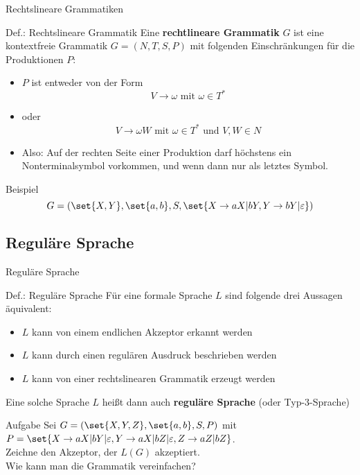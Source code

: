 \begin{frame}{Rechtslineare Grammatiken}
\begin{block}{Def.: Rechtslineare Grammatik}
	Eine \textbf{rechtlineare Grammatik} $G$ ist eine kontextfreie Grammatik $G = (N,T,S,P)$ mit folgenden Einschränkungen für die Produktionen $P$:\\
	\begin{itemize}
			\item $P$ ist entweder von der Form \[
		V \to \omega \text{ mit } \omega \in T^*
	\]
	\item oder \[
		V \to \omega W \text{ mit } \omega \in T^* \text{ und } V,W \in N
	\]
	\item Also: Auf der rechten Seite einer Produktion darf höchstens ein Nonterminalsymbol vorkommen, und wenn dann nur als letztes Symbol.
	\end{itemize}
\end{block}
\pause
\begin{exampleblock}{Beispiel}
	\[
		G = (\set{X,Y}, \set{a,b}, S, \set{X \to aX | bY, Y \to bY | \varepsilon})
	\]
\end{exampleblock}
\end{frame}

\subsection{Reguläre Sprache}
\begin{frame}{Reguläre Sprache}
    \begin{block}{Def.: Reguläre Sprache}
    	Für eine formale Sprache $L$ sind folgende drei Aussagen äquivalent:
    	\begin{itemize}
    		\item $L$ kann von einem endlichen Akzeptor erkannt werden
    		\item $L$ kann durch einen regulären Ausdruck beschrieben werden
    		\item $L$ kann von einer rechtslinearen Grammatik erzeugt werden
    	\end{itemize}
    	Eine solche Sprache $L$ heißt dann auch \textbf{reguläre Sprache} (oder Typ-3-Sprache) 
    \end{block}

    \begin{exampleblock}{Aufgabe}
    	Sei $G=(\set{X,Y,Z},\set{a,b},S,P)$ mit $P = \set{
    		X \to aX | bY | \varepsilon,
    		Y \to aX | bZ | \varepsilon, 
    		Z \to aZ | bZ
    	}$.\\ 
    	Zeichne den Akzeptor, der $L(G)$ akzeptiert.\\
    	Wie kann man die Grammatik vereinfachen?
    \end{exampleblock}
\end{frame}


